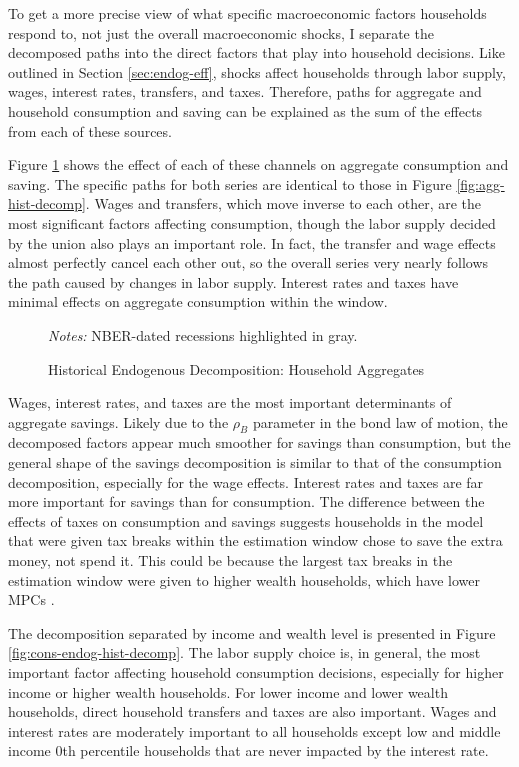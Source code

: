 To get a more precise view of what specific macroeconomic factors households respond to, not just the overall macroeconomic shocks, I separate the decomposed paths into the direct factors that play into household decisions. Like outlined in Section \ref{sec:endog-eff}, shocks affect households through labor supply, wages, interest rates, transfers, and taxes. Therefore, paths for aggregate and household consumption and saving can be explained as the sum of the effects from each of these sources.

Figure \ref{fig:agg-endog-hist-decomp} shows the effect of each of these channels on aggregate consumption and saving. The specific paths for both series are identical to those in Figure \ref{fig:agg-hist-decomp}. Wages and transfers, which move inverse to each other, are the most significant factors affecting consumption, though the labor supply decided by the union also plays an important role. In fact, the transfer and wage effects almost perfectly cancel each other out, so the overall series very nearly follows the path caused by changes in labor supply. Interest rates and taxes have minimal effects on aggregate consumption within the window.

\begin{figure}[t]
    \centering
    \caption{Historical Endogenous Decomposition: Household Aggregates}
    

    {\scriptsize \emph{Notes:} NBER-dated recessions highlighted in gray.}
    \label{fig:agg-endog-hist-decomp}
\end{figure}

Wages, interest rates, and taxes are the most important determinants of aggregate savings. Likely due to the $\rho_B$ parameter in the bond law of motion, the decomposed factors appear much smoother for savings than consumption, but the general shape of the savings decomposition is similar to that of the consumption decomposition, especially for the wage effects. Interest rates and taxes are far more important for savings than for consumption. The difference between the effects of taxes on consumption and savings suggests households in the model that were given tax breaks within the estimation window chose to save the extra money, not spend it. This could be because the largest tax breaks in the estimation window were given to higher wealth households, which have lower MPCs \autocite{auclert2023mpcs}.

The decomposition separated by income and wealth level is presented in Figure \ref{fig:cons-endog-hist-decomp}. The labor supply choice is, in general, the most important factor affecting household consumption decisions, especially for higher income or higher wealth households. For lower income and lower wealth households, direct household transfers and taxes are also important. Wages and interest rates are moderately important to all households except low and middle income 0th percentile households that are never impacted by the interest rate.

